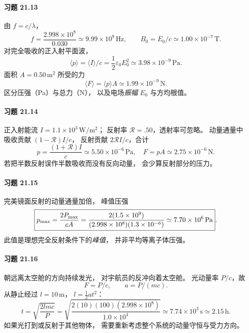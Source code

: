 \paragraph{习题 21.13}
由 \(f=c/\lambda\)，
\[
\boxed{f=\frac{2.998\times10^8}{0.030}
\simeq9.99\times10^9\,\mathrm{Hz}},\qquad
\boxed{B_0=E_0/c\simeq1.00\times10^{-7}\,\mathrm T}.
\]
对完全吸收的正入射平面波，
\[
\langle p\rangle=\langle I\rangle/c
=\frac12\varepsilon_0E_0^2
\simeq3.98\times10^{-9}\,\mathrm{Pa}.
\]
面积 \(A=0.50\,\mathrm{m^2}\) 所受的力
\[
\boxed{\langle F\rangle=\langle p\rangle A
\simeq1.99\times10^{-9}\,\mathrm N}.
\]
区分压强（Pa）与总力（N），
以及电场\emph{振幅} \(E_0\) 与方均根值。

\paragraph{习题 21.14}
正入射能流 \(I=1.1\times10^3\,\mathrm{W/m^2}\)；
反射率 \(\mathcal R=.50\)，透射率可忽略。
动量通量中吸收贡献 \((1-\mathcal R)I/c\)，
反射贡献 \(2\mathcal RI/c\)，合计
\[
\boxed{p=\frac{(1+\mathcal R)I}{c}
\simeq5.50\times10^{-6}\,\mathrm{Pa}},\quad
\boxed{F=pA
\simeq2.75\times10^{-6}\,\mathrm N}.
\]
若把半数反射误作半数吸收而没有反向动量，
会少算反射部分的压力。

\paragraph{习题 21.15}
完美镜面反射的动量通量加倍，
峰值压强
\[
\boxed{p_{\rm max}=\frac{2P_{\rm max}}{cA}
=\frac{2(1.5\times10^9)}
{(2.998\times10^8)(1.3\times10^{-6})}
\simeq7.70\times10^6\,\mathrm{Pa}}.
\]
此值是理想完全反射条件下的\emph{峰值}，
并非平均等离子体压强。

\paragraph{习题 21.16}
朝远离太空舱的方向持续发光，
对宇航员的反冲向着太空舱。
光动量率 \(P/c\)，故
\[
F=P/c,\qquad a=P/(mc).
\]
从静止经过 \(l=10\,\mathrm m\)，
\(l=\frac12at^2\)：
\[
\boxed{t=\sqrt{\frac{2lmc}{P}}
=\sqrt{\frac{2(10)(100)(2.998\times10^8)}{1.0\times10^4}}
\simeq7.74\times10^3\,\mathrm s
\simeq2.15\,\mathrm h}.
\]
如果光打到或反射于其他物体，
需要重新考虑整个系统的动量守恒与受力方向。

